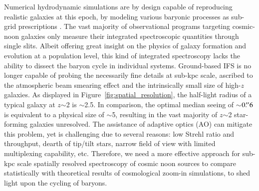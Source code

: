 Numerical hydrodynamic simulations are by design capable of reproducing realistic galaxies at this epoch, by
modeling various baryonic processes as sub-grid prescriptions
\citep{Dave:2017gd,FIRESimulations:2017wj,Pillepich:2019uz}. The vast majority of observational programs
targeting cosmic-noon galaxies only measure their integrated spectroscopic quantities through single slits.
Albeit offering great insight on the physics of galaxy formation and evolution at a population level, this kind
of integrated spectroscopy lacks the ability to dissect the baryon cycle in individual systems.
Ground-based IFS is no longer capable of probing the necessarily fine details at sub-kpc scale, ascribed to the
atmospheric beam smearing effect and the intrinsically small size of high-$z$ galaxies.  As displayed in
Figure~\ref{fig:spatial_resolution}, the half-light radius of a typical \Lstar galaxy at $z$$\sim$2 is
$\sim$2.5\kpc. In comparison, the optimal median seeing of $\sim$$0\mbox{$.\!^{\prime\prime}$}6$ is equivalent to a physical size of
$\sim$5\kpc, resulting in the vast majority of $z$$\sim$2 star-forming galaxies unresolved.  The assistance of
adaptive optics (AO) can mitigate this problem, yet is challenging due to several reasons: low Strehl ratio and
throughput, dearth of tip/tilt stars, narrow field of view with limited multiplexing capability, etc.  Therefore,
we need a more effective approach for sub-kpc scale spatially resolved spectroscopy of cosmic noon sources to
compare statistically with theoretical results of cosmological zoom-in simulations, to shed light upon the
cycling of baryons.

